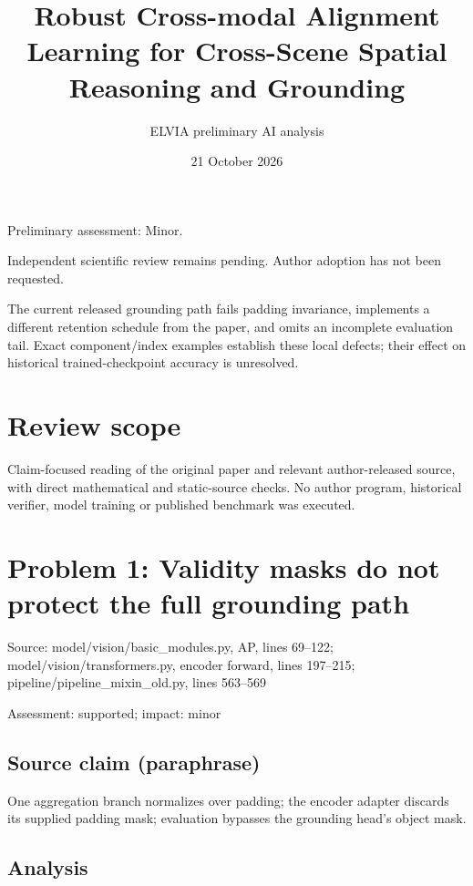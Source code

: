 \documentclass[11pt]{article}
\begin{document}
\title{Robust Cross-modal Alignment Learning for Cross-Scene Spatial Reasoning and Grounding}

\author{ELVIA preliminary AI analysis}\date{21 October 2026}\maketitle

Preliminary assessment: Minor.\par

Independent scientific review remains pending. Author adoption has not been requested.

The current released grounding path fails padding invariance, implements a different retention schedule from the paper, and omits an incomplete evaluation tail. Exact component/index examples establish these local defects; their effect on historical trained-checkpoint accuracy is unresolved.

\section*{Review scope}

Claim-focused reading of the original paper and relevant author-released source, with direct mathematical and static-source checks. No author program, historical verifier, model training or published benchmark was executed.

\section*{Problem 1: Validity masks do not protect the full grounding path}

Source: model/vision/basic\_modules.py, AP, lines 69–122; model/vision/transformers.py, encoder forward, lines 197–215; pipeline/pipeline\_mixin\_old.py, lines 563–569

Assessment: supported; impact: minor

\subsection*{Source claim (paraphrase)}

One aggregation branch normalizes over padding; the encoder adapter discards its supplied padding mask; evaluation bypasses the grounding head’s object mask.

\subsection*{Analysis}
\end{document}
